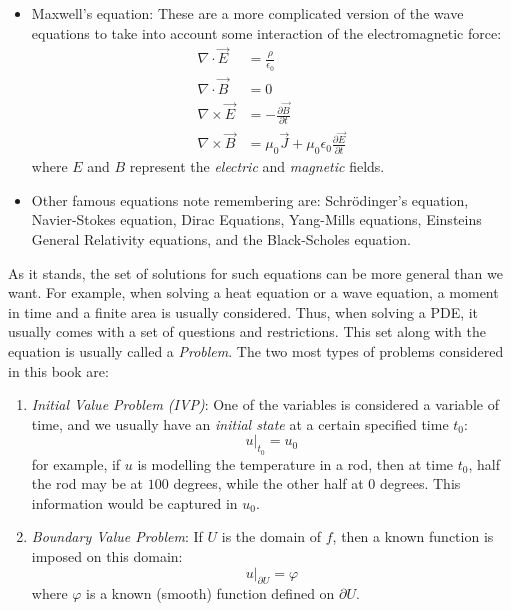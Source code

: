 \documentclass{book}
\renewcommand{\phi}{\varphi}
\begin{document}
\begin{itemize}
	\item Maxwell's equation: These are a more complicated version of the wave equations to take into account some
		interaction of the electromagnetic force:
		\[
			\begin{aligned}
				\nabla \cdot \vec{E} &= \frac{\rho}{\epsilon_0} \\
				\nabla \cdot \vec{B} &= 0 \\
				\nabla \times \vec{E} &= -\frac{\partial \vec{B}}{\partial t} \\
				\nabla \times \vec{B} &= \mu_0 \vec{J} + \mu_0 \epsilon_0 \frac{\partial \vec{E}}{\partial t}
			\end{aligned}
		\]
		where $E$ and $B$ represent the \emph{electric} and \emph{magnetic} fields.
		\item Other famous equations note remembering are: Schrödinger's equation, Navier-Stokes equation,
			Dirac Equations, Yang-Mills equations, Einsteins General Relativity equations, and the
			Black-Scholes equation.
\end{itemize}

As it stands, the set of solutions for such equations can be more general than we want. For example, when
solving a heat equation or a wave equation, a moment in time and a finite area is usually considered. Thus,
when solving a PDE, it usually comes with a set of questions and restrictions. This set along with the
equation is usually called a \emph{Problem}. The two most types of problems considered in this book are:


\begin{enumerate}
	\item \emph{Initial Value Problem (IVP)}: One of the variables is considered a variable of time, and we
		usually have an \emph{initial state} at a certain specified time $t_0$:
		\[
			u|_{t_0} = u_0
		\]
		for example, if $u$ is modelling the temperature in a rod, then at time $t_0$, half the rod may be at
		$100$ degrees, while the other half at $0$ degrees. This information would be captured in $u_0$.
	\item \emph{Boundary Value Problem}: If $U$ is the domain of $f$, then a known function is imposed on this
		domain:
		\[
			u|_{\partial U} = \phi
		\]
		where $\phi$ is a known (smooth) function defined on $\partial U$.
\end{enumerate}
\end{document}
